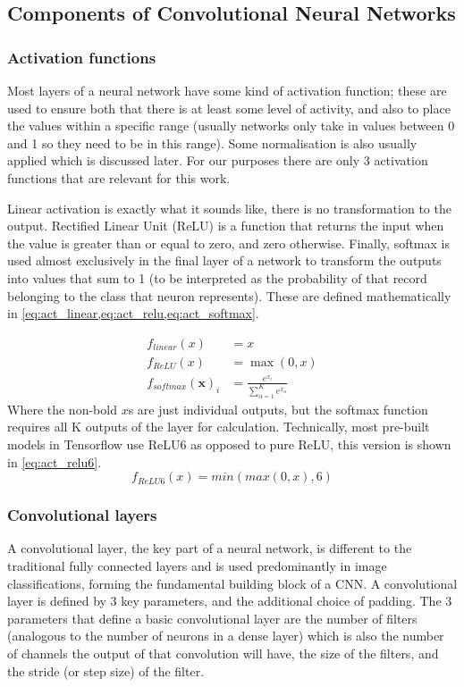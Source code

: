 \documentclass[12pt]{article}
\numberwithin{equation}{section}
\numberwithin{figure}{section}
\begin{document}
\subsection{Components of Convolutional Neural Networks} 
\label{sub:Components_of_Convolutional_Neural_Networks} 
\subsubsection{Activation functions}
Most layers of a neural network have some kind of activation function; these are used to ensure both that there is at least some level of activity, and also to place the values within a specific range (usually networks only take in values between 0 and 1 so they need to be in this range). Some normalisation is also usually applied which is discussed later. For our purposes there are only 3 activation functions that are relevant for this work.

Linear activation is exactly what it sounds like, there is no transformation to the output. Rectified Linear Unit (ReLU) is a function that returns the input when the value is greater than or equal to zero, and zero otherwise. Finally, softmax is used almost exclusively in the final layer of a network to transform the outputs into values that sum to 1 (to be interpreted as the probability of that record belonging to the class that neuron represents). These are defined mathematically in \cref{eq:act_linear,eq:act_relu,eq:act_softmax}.

\begin{align}
	f_{linear}(x) &= x \label{eq:act_linear}\\
	f_{ReLU}(x)   &= \max(0, x) \label{eq:act_relu}\\
	f_{softmax}(\bm{x})_i &= \frac{e^{x_i}}{\sum_{\alpha=1}^{K}{e^{x_\alpha}}}\label{eq:act_softmax}
\end{align}
Where the non-bold $x$s are just individual outputs, but the softmax function requires all K outputs of the layer for calculation. Technically, most pre-built models in Tensorflow use ReLU6 as opposed to pure ReLU, this version is shown in \cref{eq:act_relu6}.
\begin{equation}
	f_{ReLU6}(x) = min(max(0, x), 6) \label{eq:act_relu6}
\end{equation}

\subsubsection{Convolutional layers}
A convolutional layer, the key part of a neural network, is different to the traditional fully connected layers and is used predominantly in image classifications, forming the fundamental building block of a CNN. A convolutional layer is defined by 3 key parameters, and the additional choice of padding. The 3 parameters that define a basic convolutional layer are the number of filters (analogous to the number of neurons in a dense layer) which is also the number of channels the output of that convolution will have, the size of the filters, and the stride (or step size) of the filter. 
\end{document}
